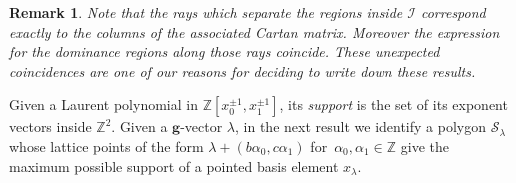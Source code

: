 \documentclass[pdflatex,sn-mathphys]{sn-jnl}%
\theoremstyle{thmstyleone}%
\theoremstyle{thmstyletwo}%
\newtheorem{remark}[theorem]{Remark}%
\theoremstyle{thmstylethree}%
\newcommand{\bfg}{\boldsymbol{g}}
\newcommand{\cI}{\mathcal{I}}
\newcommand{\cS}{\mathcal{S}}
\newcommand{\ZZ}{\mathbb{Z}}
\begin{document}
  \begin{remark}
    Note that the rays which separate the regions inside $\cI$ correspond exactly to the columns of the associated Cartan matrix. %
    Moreover the expression for the dominance regions along those rays coincide.
    These unexpected coincidences are one of our reasons for deciding to write down these results.
  \end{remark}

  Given a Laurent polynomial in $\ZZ[x_0^{\pm1},x_1^{\pm1}]$, its \emph{support} is the set of its exponent vectors inside $\ZZ^2$.
  Given a $\bfg$-vector $\lambda$, in the next result we identify a polygon $\cS_\lambda$ whose lattice points of the form $\lambda+(b \alpha_0 ,c \alpha_1)$ for~$\alpha_0,\alpha_1\in\ZZ$ give the maximum possible support of a pointed basis element $x_\lambda$. 
\end{document}
